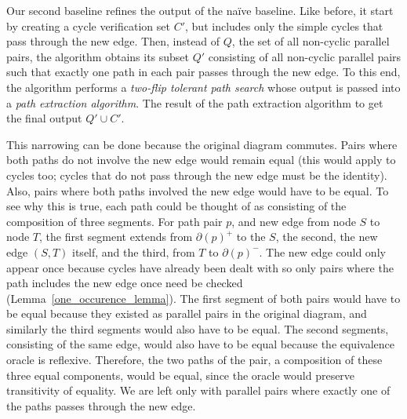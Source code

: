 \documentclass[sigplan,review,anonymous]{acmart}
\begin{document}
Our second baseline refines the output of the na\"{i}ve baseline.
Like before, it start by creating a cycle verification set $C'$, but includes only the simple cycles that pass through the new edge.
Then, instead of $Q$, the set of all non-cyclic parallel pairs, the algorithm obtains its subset $Q'$ consisting of all non-cyclic parallel pairs such that exactly one path in each pair passes through the new edge.
To this end, the algorithm performs a \textit{two-flip tolerant path search} whose output is passed into a \textit{path extraction algorithm}.
The result of the path extraction algorithm to get the final output $Q' \cup C'$.

This narrowing can be done because the original diagram commutes.
Pairs where both paths do not involve the new edge would remain equal (this would apply to cycles too; cycles that do not pass through the new edge must be the identity).
Also, pairs where both paths involved the new edge would have to be equal.
To see why this is true, each path could be thought of as consisting of the composition of three segments.
For path pair $p$, and new edge from node $S$ to node $T$, the first segment extends from $\partial(p)^+$ to the $S$, the second, the new edge $(S, T)$ itself, and the third, from $T$ to $\partial(p)^-$.
The new edge could only appear once because cycles have already been dealt with so only pairs where the path includes the new edge once need be checked (Lemma~\ref{one_occurence_lemma}).
The first segment of both pairs would have to be equal because they existed as parallel pairs in the original diagram, and similarly the third segments would also have to be equal.
The second segments, consisting of the same edge, would also have to be equal because the equivalence oracle is reflexive.
Therefore, the two paths of the pair, a composition of these three equal components, would be equal, since the oracle would preserve transitivity of equality.
We are left only with parallel pairs where exactly one of the paths passes through the new edge.

\end{document}
